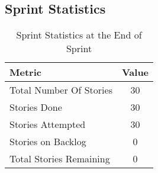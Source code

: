 \subsection{Sprint Statistics}
\begin{table}[H]
    \centering
    \begin{tabular}{|l|c|}
    \hline
    \textbf{Metric} & \textbf{Value} \\ \hline
    Total Number Of Stories & 30 \\ \hline
    Stories Done & 30 \\ \hline
    Stories Attempted & 30 \\ \hline
    Stories on Backlog & 0 \\ \hline
    Total Stories Remaining & 0 \\ \hline
    \end{tabular}
    \caption{Sprint Statistics at the End of Sprint}
    \label{tab:sprint_statistics}
\end{table}

\clearpage

